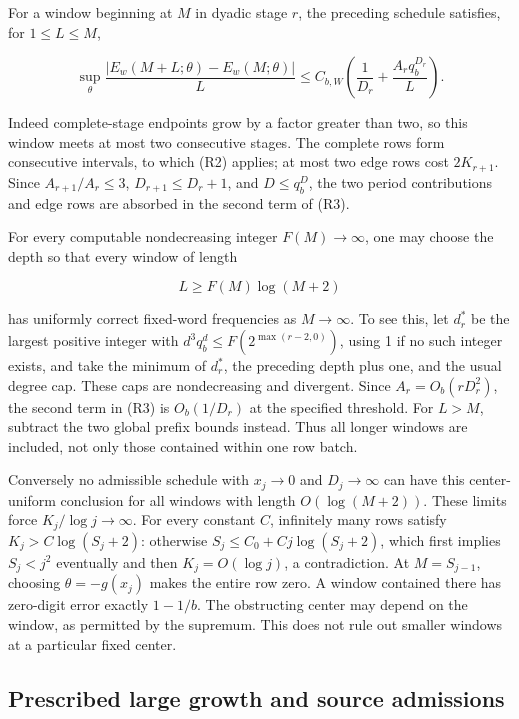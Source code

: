 \documentclass[11pt,a4paper]{article}
\begin{document}
For a window beginning at \(M\) in dyadic stage \(r\), the preceding
schedule satisfies, for \(1\le L\le M\),

\[
\sup_\theta\frac{|E_w(M+L;\theta)-E_w(M;\theta)|}{L}
\le C_{b,W}\left(\frac1{D_r}+\frac{A_rq_b^{D_r}}L\right).
\tag{R3}
\]

Indeed complete-stage endpoints grow by a factor greater than two, so
this window meets at most two consecutive stages. The complete rows form
consecutive intervals, to which (R2) applies; at most two edge rows cost
\(2K_{r+1}\). Since \(A_{r+1}/A_r\le3\), \(D_{r+1}\le D_r+1\), and
\(D\le q_b^D\), the two period contributions and edge rows are absorbed
in the second term of (R3).

For every computable nondecreasing integer \(F(M)\to\infty\), one may
choose the depth so that every window of length

\[
L\ge F(M)\log(M+2)
\]

has uniformly correct fixed-word frequencies as \(M\to\infty\). To see
this, let \(d_r^*\) be the largest positive integer with
\(d^3q_b^d\le F(2^{\max(r-2,0)})\), using 1 if no such integer exists,
and take the minimum of \(d_r^*\), the preceding depth plus one, and the
usual degree cap. These caps are nondecreasing and divergent. Since
\(A_r=O_b(rD_r^2)\), the second term in (R3) is \(O_b(1/D_r)\) at the
specified threshold. For \(L>M\), subtract the two global prefix bounds
instead. Thus all longer windows are included, not only those contained
within one row batch.

Conversely no admissible schedule with \(x_j\to0\) and \(D_j\to\infty\)
can have this center-uniform conclusion for all windows with length
\(O(\log(M+2))\). These limits force \(K_j/\log j\to\infty\). For every
constant \(C\), infinitely many rows satisfy \(K_j>C\log(S_j+2)\):
otherwise \(S_j\le C_0+Cj\log(S_j+2)\), which first implies \(S_j< j^2\)
eventually and then \(K_j=O(\log j)\), a contradiction. At
\(M=S_{j-1}\), choosing \(\theta=-g(x_j)\) makes the entire row zero. A
window contained there has zero-digit error exactly \(1-1/b\). The
obstructing center may depend on the window, as permitted by the
supremum. This does not rule out smaller windows at a particular fixed
center.

\subsection{Prescribed large growth and source
admissions}\label{prescribed-large-growth-and-source-admissions}
\end{document}
